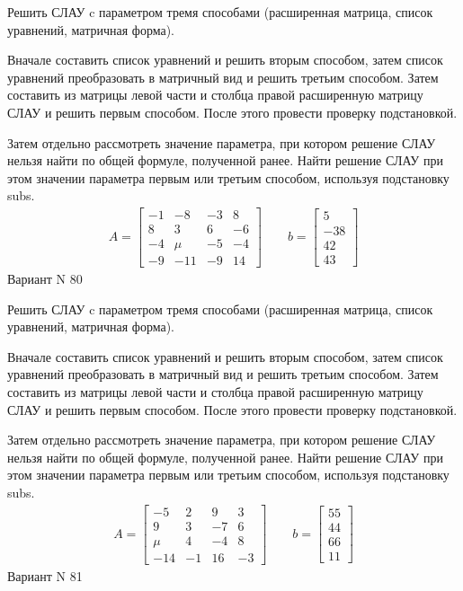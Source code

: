 \documentclass[11pt]{report}
\begin{document}
Решить СЛАУ c параметром тремя способами (расширенная матрица, список уравнений, матричная форма).

Вначале составить список уравнений и решить вторым способом,
затем список уравнений преобразовать в матричный вид и решить третьим способом.
Затем составить из матрицы левой части и столбца правой расширенную матрицу СЛАУ и решить первым способом.
После этого провести проверку подстановкой.

Затем отдельно рассмотреть значение параметра, при котором решение СЛАУ нельзя найти по общей формуле,
полученной ранее.
Найти решение СЛАУ при этом значении параметра первым или третьим способом, используя подстановку subs.
\begin{align*}
    A = \left[\begin{matrix}-1 & -8 & -3 & 8\\8 & 3 & 6 & -6\\-4 & \mu & -5 & -4\\-9 & -11 & -9 & 14\end{matrix}\right]
\qquad b = \left[\begin{matrix}5\\-38\\42\\43\end{matrix}\right]
\end{align*}
\newpage
Вариант N 80


Решить СЛАУ c параметром тремя способами (расширенная матрица, список уравнений, матричная форма).

Вначале составить список уравнений и решить вторым способом,
затем список уравнений преобразовать в матричный вид и решить третьим способом.
Затем составить из матрицы левой части и столбца правой расширенную матрицу СЛАУ и решить первым способом.
После этого провести проверку подстановкой.

Затем отдельно рассмотреть значение параметра, при котором решение СЛАУ нельзя найти по общей формуле,
полученной ранее.
Найти решение СЛАУ при этом значении параметра первым или третьим способом, используя подстановку subs.
\begin{align*}
    A = \left[\begin{matrix}-5 & 2 & 9 & 3\\9 & 3 & -7 & 6\\\mu & 4 & -4 & 8\\-14 & -1 & 16 & -3\end{matrix}\right]
\qquad b = \left[\begin{matrix}55\\44\\66\\11\end{matrix}\right]
\end{align*}
\newpage
Вариант N 81
\end{document}
